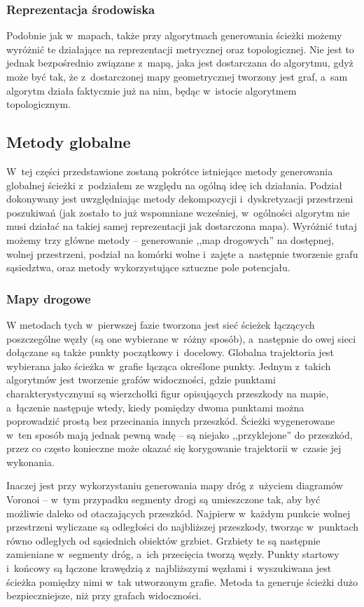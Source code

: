 \subsubsection{Reprezentacja środowiska}

Podobnie jak w~mapach, także przy algorytmach generowania ścieżki możemy wyróżnić
te działające na reprezentacji metrycznej oraz topologicznej. Nie jest to jednak
bezpośrednio związane z~mapą, jaka jest dostarczana do algorytmu, gdyż może być tak,
że z~dostarczonej mapy geometrycznej tworzony jest graf, a~sam algorytm działa faktycznie
już na nim, będąc w~istocie algorytmem topologicznym.

\subsection{Metody globalne}

W~tej części przedstawione zostaną pokrótce istniejące metody generowania globalnej
ścieżki z~podziałem ze względu na ogólną ideę ich działania. Podział dokonywany
jest uwzględniając metody dekompozycji i~dyskretyzacji przestrzeni poszukiwań (jak zostało
to już wspomniane wcześniej, w~ogólności algorytm nie musi działać na takiej samej reprezentacji
jak dostarczona mapa). Wyróżnić tutaj możemy trzy główne metody -- generowanie
,,map drogowych'' na dostępnej, wolnej przestrzeni, podział na komórki wolne i~zajęte
a~następnie tworzenie grafu sąsiedztwa, oraz metody wykorzystujące sztuczne pole potencjału.

\subsubsection{Mapy drogowe}

W metodach tych w~pierwszej fazie tworzona jest sieć ścieżek łączących poszczególne
węzły (są one wybierane w~różny sposób), a~następnie do owej sieci dołączane są
także punkty początkowy i~docelowy. Globalna trajektoria jest wybierana jako ścieżka
w~grafie łącząca określone punkty. Jednym z~takich algorytmów jest tworzenie grafów
widoczności, gdzie punktami charakterystycznymi są wierzchołki figur opisujących
przeszkody na mapie, a~łączenie następuje wtedy, kiedy pomiędzy dwoma punktami można
poprowadzić prostą bez przecinania innych przeszkód. Ścieżki wygenerowane w~ten sposób
mają jednak pewną wadę -- są niejako ,,przyklejone'' do przeszkód, przez co często
konieczne może okazać się korygowanie trajektorii w~czasie jej wykonania.

Inaczej jest przy wykorzystaniu generowania mapy dróg z~użyciem diagramów Voronoi -- w~tym
przypadku segmenty drogi są umieszczone tak, aby być możliwie daleko od otaczających
przeszkód. Najpierw w~każdym punkcie wolnej przestrzeni wyliczane są odległości
do najbliższej przeszkody, tworząc w~punktach równo odległych od sąsiednich obiektów
grzbiet. Grzbiety te są następnie zamieniane w~segmenty dróg, a~ich przecięcia tworzą
węzły. Punkty startowy i~końcowy są łączone krawędzią z~najbliższymi węzłami i~wyszukiwana
jest ścieżka pomiędzy nimi w~tak utworzonym grafie. Metoda ta generuje ścieżki
dużo bezpieczniejsze, niż przy grafach widoczności.

